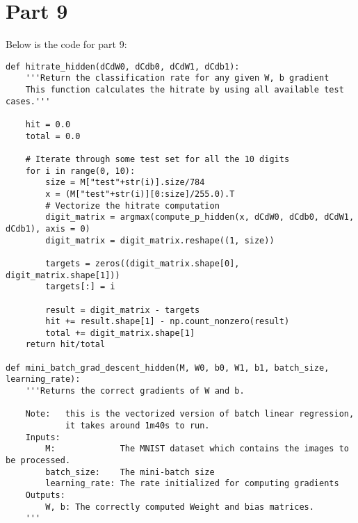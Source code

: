 \documentclass{article}
\begin{document}
\section*{Part 9}
\indent \indent Below is the code for part 9:
\begin{lstlisting}
def hitrate_hidden(dCdW0, dCdb0, dCdW1, dCdb1):
    '''Return the classification rate for any given W, b gradient
    This function calculates the hitrate by using all available test cases.'''

    hit = 0.0
    total = 0.0

    # Iterate through some test set for all the 10 digits
    for i in range(0, 10):
        size = M["test"+str(i)].size/784
        x = (M["test"+str(i)][0:size]/255.0).T
        # Vectorize the hitrate computation
        digit_matrix = argmax(compute_p_hidden(x, dCdW0, dCdb0, dCdW1, dCdb1), axis = 0)
        digit_matrix = digit_matrix.reshape((1, size))
        
        targets = zeros((digit_matrix.shape[0], digit_matrix.shape[1]))
        targets[:] = i
        
        result = digit_matrix - targets
        hit += result.shape[1] - np.count_nonzero(result)
        total += digit_matrix.shape[1]
    return hit/total

def mini_batch_grad_descent_hidden(M, W0, b0, W1, b1, batch_size, learning_rate):
    '''Returns the correct gradients of W and b.
    
    Note:   this is the vectorized version of batch linear regression, 
            it takes around 1m40s to run.
    Inputs:
        M:             The MNIST dataset which contains the images to be processed.
        batch_size:    The mini-batch size
        learning_rate: The rate initialized for computing gradients
    Outputs:
        W, b: The correctly computed Weight and bias matrices.
    '''


\end{lstlisting}
\end{document}
